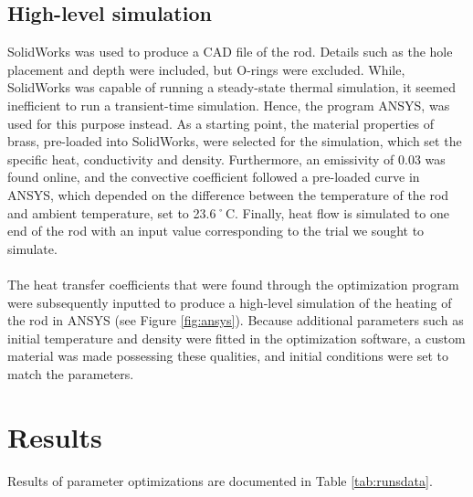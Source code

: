 \documentclass[letterpaper,titlepage,oneside]{report}
\begin{document}
\section{High-level simulation}
SolidWorks was used to produce a CAD file of the rod. Details such as
 the hole placement and depth were included, but O-rings were excluded.
 While, SolidWorks was capable of running a steady-state thermal simulation,
 it seemed inefficient to run a transient-time simulation. Hence,
 the program ANSYS, was used for this purpose instead.
 As a starting point, the material properties of brass, pre-loaded
 into SolidWorks, were selected for the simulation, which set the
 specific heat, conductivity and density. Furthermore, an emissivity
 of 0.03 was found online, and the convective coefficient followed
 a pre-loaded curve in ANSYS, which depended on the difference
 between the temperature of the rod and ambient temperature,
 set to 23.6˚C. Finally, heat flow is simulated to one end of the rod
 with an input value corresponding to the trial we sought to simulate.
\\\\
The heat transfer coefficients that were found through the
optimization program were subsequently inputted to produce a high-level
simulation of the heating of the rod in ANSYS
(see Figure \ref{fig:ansys}). Because additional
parameters such as initial temperature and density were
fitted in the optimization software, a custom material was made
possessing these qualities, and initial conditions were set to
match the parameters.

\chapter{Results}
\label{ch:results}
Results of parameter optimizations are documented in Table
\ref{tab:runsdata}.
\end{document}
